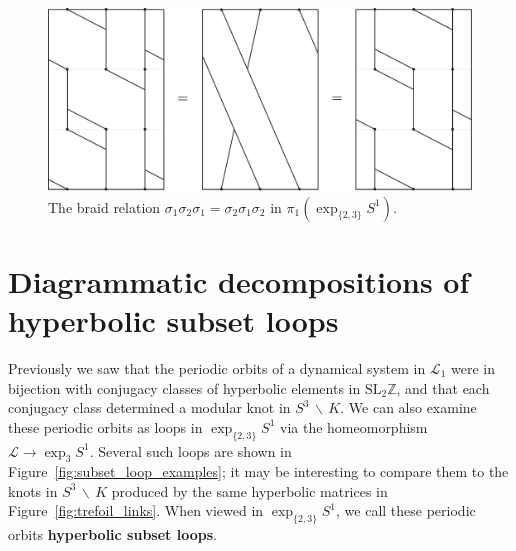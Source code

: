 \documentclass[12pt,twoside]{reedthesis}
\theoremstyle{definition}
\newcommand{\Z}{\mathbb{Z}}
\newcommand{\LS}{\mathcal{L}}
\newcommand{\SLZ}{\mathrm{SL}_2{\Z}}
\newcommand{\exptwothree}{\exp_{\{2,3\}}}
\newcommand{\wo}{\, \backslash \,}
\newcommand{\defnphrase}[1]{\textbf{#1}}
\begin{document}
\begin{figure}[h]
  \centering
  \includegraphics[width=0.8\linewidth]{figures/braid_relation_exp.pdf}
  \caption{The braid relation $\sigma_1 \sigma_2 \sigma_1 = \sigma_2 \sigma_1 \sigma_2$ in $\pi_1(\exptwothree S^1)$.}
  \label{fig:braid_relation_exp}
\end{figure}

\section{Diagrammatic decompositions of hyperbolic subset loops}

Previously we saw that the periodic orbits of a dynamical system in $\LS_1$ were in bijection with conjugacy classes of hyperbolic elements in $\SLZ$, and that each conjugacy class determined a modular knot in $S^3 \wo K$.
We can also examine these periodic orbits as loops in $\exptwothree S^1$ via the homeomorphism $\LS \to \exp_3 S^1$.
Several such loops are shown in Figure~\ref{fig:subset_loop_examples}; it may be interesting to compare them to the knots in $S^3 \wo K$ produced by the same hyperbolic matrices in Figure~\ref{fig:trefoil_links}.
When viewed in $\exptwothree S^1$, we call these periodic orbits \defnphrase{hyperbolic subset loops}.
\end{document}

